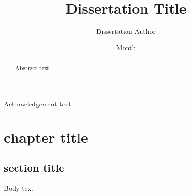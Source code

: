 \documentclass[12pt, pdftex, openany]{cmu_mse_dissertation}
\begin{document}
 

\frontmatter

\pagestyle{empty}

\title{\bf \textsf{Dissertation Title}}
\author{Dissertation Author}
\date{Month}


\support{}
\disclaimer{}


\maketitle

\begin{keywordspage}

\end{keywordspage}
\pagestyle{plain} %


\begin{abstract}
Abstract text
\end{abstract}

\begin{acknowledgments}
Acknowledgement text
\end{acknowledgments}

\tableofcontents
\listoffigures
\listoftables

\mainmatter

\chapter{chapter title}
\section{section title}
Body text \cite{article_template}
%
%
%
%
%

% 

\backmatter
\clearpage\printbibliography
\end{document}

